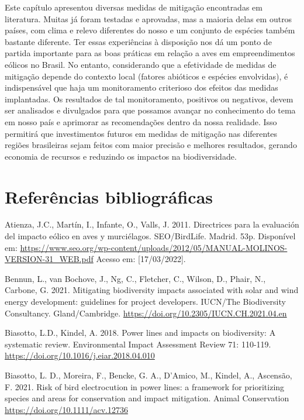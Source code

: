 \documentclass[
  oneside]{scrbook}
\begin{document}
Este capítulo apresentou diversas medidas de mitigação encontradas em literatura. Muitas já foram testadas e aprovadas, mas a maioria delas em outros países, com clima e relevo diferentes do nosso e um conjunto de espécies também bastante diferente. Ter essas experiências à disposição nos dá um ponto de partida importante para as boas práticas em relação a aves em empreendimentos eólicos no Brasil. No entanto, considerando que a efetividade de medidas de mitigação depende do contexto local (fatores abióticos e espécies envolvidas), é indispensável que haja um monitoramento criterioso dos efeitos das medidas implantadas. Os resultados de tal monitoramento, positivos ou negativos, devem ser analisados e divulgados para que possamos avançar no conhecimento do tema em nosso país e aprimorar as recomendações dentro da nossa realidade. Isso permitirá que investimentos futuros em medidas de mitigação nas diferentes regiões brasileiras sejam feitos com maior precisão e melhores resultados, gerando economia de recursos e reduzindo os impactos na biodiversidade.

\hypertarget{referuxeancias-bibliogruxe1ficas-4}{%
\section{Referências bibliográficas}\label{referuxeancias-bibliogruxe1ficas-4}}

Atienza, J.C., Martín, I., Infante, O., Valls, J. 2011. Directrices para la evaluación del impacto eólico en aves y murciélagos. SEO/BirdLife. Madrid. 53p. Disponível em: \url{https://www.seo.org/wp-content/uploads/2012/05/MANUAL-MOLINOS-VERSION-31_WEB.pdf} Acesso em: {[}17/03/2022{]}.

Bennun, L., van Bochove, J., Ng, C., Fletcher, C., Wilson, D., Phair, N., Carbone, G. 2021. Mitigating biodiversity impacts associated with solar and wind energy development: guidelines for project developers. IUCN/The Biodiversity Consultancy. Gland/Cambridge. \url{https://doi.org/10.2305/IUCN.CH.2021.04.en}

Biasotto, L.D., Kindel, A. 2018. Power lines and impacts on biodiversity: A systematic review. Environmental Impact Assessment Review 71: 110-119. \url{https://doi.org/10.1016/j.eiar.2018.04.010}

Biasotto, L. D., Moreira, F., Bencke, G. A., D'Amico, M., Kindel, A., Ascensão, F. 2021. Risk of bird electrocution in power lines: a framework for prioritizing species and areas for conservation and impact mitigation. Animal Conservation \url{https://doi.org/10.1111/acv.12736}
\end{document}
